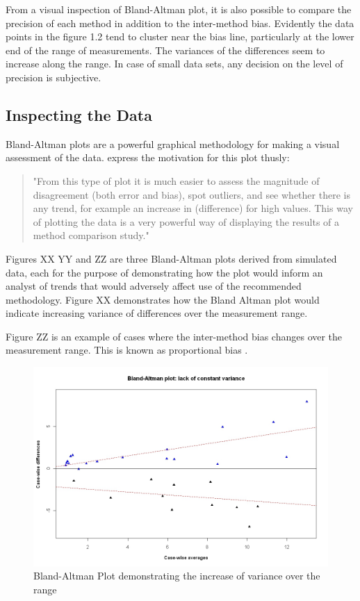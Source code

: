 \documentclass[12pt, a4paper]{report}
\begin{document}
From a visual inspection of Bland-Altman plot, it is also possible to compare the precision of each method in addition to the
inter-method bias.  Evidently the data points in the figure 1.2 tend to cluster near the bias line, particularly at the lower end
of the range of measurements. The variances of the differences seem to increase along the range. In case of small data sets, any
decision on the level of precision is subjective.

\subsection{Inspecting the Data}
Bland-Altman plots are a powerful graphical methodology for making a visual assessment of the data. \citet*{BA83} express the
motivation for this plot thusly:
\begin{quote}
"From this type of plot it is much easier to assess the magnitude of disagreement (both error and bias), spot outliers, and see
whether there is any trend, for example an increase in (difference) for high values. This way of plotting the data is a
very powerful way of displaying the results of a method comparison study."
\end{quote}


Figures XX YY and ZZ are three Bland-Altman plots derived from simulated data, each for the purpose of demonstrating how the plot
would inform an analyst of trends that would adversely affect use of the recommended methodology. Figure XX demonstrates how the
Bland Altman plot would indicate increasing variance of differences over the measurement range.

Figure ZZ is an example of cases where the inter-method bias changes over the measurement range. This is known as proportional
bias \citep{ludbrook97}.

\newpage
\begin{figure}[h!]
\begin{center}
  \includegraphics[width=125mm]{BAFanEffect.jpeg}
  \caption{Bland-Altman Plot demonstrating the increase of variance over the range}\label{BAFanEffect}
\end{center}
\end{figure}
\end{document}
